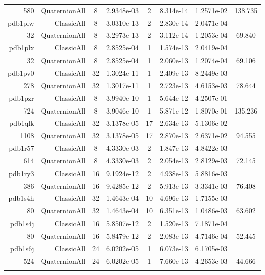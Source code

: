 \begin{xltabular}{\textwidth}{r|rcS[table-format=1.4e+2]cS[table-format=1.3e+2]S[table-format=1.4e+2]S[table-format=-1.3]}
580 & QuaternionAll & 8 & 2.9348e-03 & 2 & 8.314e-14 & 1.2571e-02 & 138.735\\  \addlinespace
pdb1plw & ClassicAll & 8 & 3.0310e-13 & 2 & 2.830e-14 & 2.0471e-04 & \\
32 & QuaternionAll & 8 & 3.2973e-13 & 2 & 3.112e-14 & 1.2053e-04 & 69.840\\  \addlinespace
pdb1plx & ClassicAll & 8 & 2.8525e-04 & 1 & 1.574e-13 & 2.0419e-04 & \\
32 & QuaternionAll & 8 & 2.8525e-04 & 1 & 2.060e-13 & 1.2074e-04 & 69.106\\  \addlinespace
pdb1pv0 & ClassicAll & 32 & 1.3024e-11 & 1 & 2.409e-13 & 8.2449e-03 & \\
278 & QuaternionAll & 32 & 1.3017e-11 & 1 & 2.723e-13 & 4.6153e-03 & 78.644\\  \addlinespace
pdb1pzr & ClassicAll & 8 & 3.9940e-10 & 1 & 5.644e-12 & 4.2507e-01 & \\
724 & QuaternionAll & 8 & 3.9046e-10 & 1 & 5.871e-12 & 1.8070e-01 & 135.236\\  \addlinespace
pdb1qlk & ClassicAll & 32 & 3.1378e-05 & 17 & 2.634e-13 & 5.1306e-02 & \\
1108 & QuaternionAll & 32 & 3.1378e-05 & 17 & 2.870e-13 & 2.6371e-02 & 94.555\\  \addlinespace
pdb1r57 & ClassicAll & 8 & 4.3330e-03 & 2 & 1.847e-13 & 4.8422e-03 & \\
614 & QuaternionAll & 8 & 4.3330e-03 & 2 & 2.054e-13 & 2.8129e-03 & 72.145\\  \addlinespace
pdb1ry3 & ClassicAll & 16 & 9.1924e-12 & 2 & 4.938e-13 & 5.8816e-03 & \\
386 & QuaternionAll & 16 & 9.4285e-12 & 2 & 5.913e-13 & 3.3341e-03 & 76.408\\  \addlinespace
pdb1s4h & ClassicAll & 32 & 1.4643e-04 & 10 & 4.696e-13 & 1.7155e-03 & \\
80 & QuaternionAll & 32 & 1.4643e-04 & 10 & 6.351e-13 & 1.0486e-03 & 63.602\\  \addlinespace
pdb1s4j & ClassicAll & 16 & 5.8507e-12 & 2 & 1.520e-13 & 7.1871e-04 & \\
80 & QuaternionAll & 16 & 5.8479e-12 & 2 & 2.083e-13 & 4.7146e-04 & 52.445\\  \addlinespace
pdb1s6j & ClassicAll & 24 & 6.0202e-05 & 1 & 6.073e-13 & 6.1705e-03 & \\
524 & QuaternionAll & 24 & 6.0202e-05 & 1 & 7.660e-13 & 4.2653e-03 & 44.666\\  \addlinespace

\end{xltabular}
